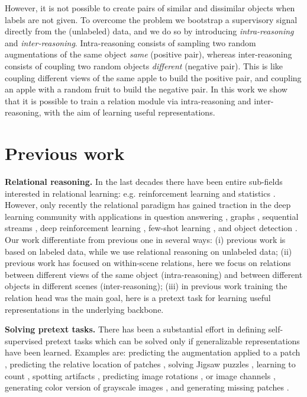 \documentclass{article}
\begin{document}
However, it is not possible to create pairs of similar and dissimilar objects when labels are not given. To overcome the problem we bootstrap a supervisory signal directly from the (unlabeled) data, and we do so by introducing \emph{intra-reasoning} and \emph{inter-reasoning}. Intra-reasoning consists of sampling two random augmentations of the same object  \emph{same} (positive pair), whereas inter-reasoning consists of coupling two random objects  \emph{different} (negative pair). This is like coupling different views of the same apple to build the positive pair, and coupling an apple with a random fruit to build the negative pair.
In this work we show that it is possible to train a relation module via intra-reasoning and inter-reasoning, with the aim of learning useful representations.


\section{Previous work}\label{sec:previous_work}

\textbf{Relational reasoning.} In the last decades there have been entire sub-fields interested in relational learning: e.g. reinforcement learning \citep{dvzeroski2001relational} and statistics \citep{koller2007introduction}. However, only recently the relational paradigm has gained traction in the deep learning community with applications in question answering \citep{santoro2017simple, raposo2017discovering}, graphs \citep{battaglia2018relational}, sequential streams \citep{santoro2018relational}, deep reinforcement learning \citep{zambaldi2019deep}, few-shot learning \citep{sung2018learning}, and object detection \citep{hu2018relation}.
Our work differentiate from previous one in several ways: (i) previous work is based on labeled data, while we use relational reasoning on unlabeled data; (ii) previous work has focused on within-scene relations, here we focus on relations between different views of the same object (intra-reasoning) and between different objects in different scenes (inter-reasoning); (iii) in previous work training the relation head was the main goal, here is a pretext task for learning useful representations in the underlying backbone.

\textbf{Solving pretext tasks.} There has been a substantial effort in defining self-supervised pretext tasks which can be solved only if generalizable representations have been learned. Examples are: predicting the augmentation applied to a patch \citep{dosovitskiy2014discriminative}, predicting the relative location of patches \citep{doersch2015unsupervised}, solving Jigsaw puzzles \citep{noroozi2016unsupervised}, learning to count \citep{noroozi2017representation}, spotting artifacts \citep{jenni2018self}, predicting image rotations \citep{gidaris2018unsupervised}, or image channels \citep{zhang2017split}, generating color version of grayscale images \citep{zhang2016colorful, larsson2016learning}, and generating missing patches \citep{pathak2016context}.
\end{document}
